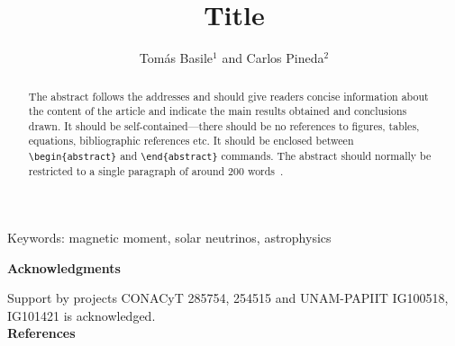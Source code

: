 \documentclass[12pt]{Template/iopart}
\newcommand\keywords[1]{Keywords: #1}
\begin{document}
\title[Title]{Title}

\author{Tomás Basile$^1$ and Carlos Pineda$^2$}

\address{$^1$ Facultad de Ciencias. Universidad Nacional Autónoma de México, Ciudad de México 01000, Mexico}
\address{$^2$ Instituto de Física, Universidad Nacional Autónoma de México, Ciudad de México 01000, México}

\begin{abstract}
The abstract follows the addresses and
should give readers concise information about the content 
of the article and indicate the main results obtained and conclusions 
drawn. It should be self-contained---there should be no references to 
figures, tables, equations, bibliographic references etc.  It should be enclosed between \verb"\begin{abstract}"
and \verb"\end{abstract}" commands.  The abstract should normally be restricted 
to a single paragraph of around 200 words~\cite{bengtsson_zyczkowski_2017}.
\end{abstract}
\keywords{magnetic moment, solar neutrinos, astrophysics} \\
\submitto{\PS}
\maketitle








\newpage
\appendix




\textbf{Acknowledgments}

Support by projects CONACyT 285754, 254515 and UNAM-PAPIIT IG100518, IG101421 is
acknowledged.  \\


\textbf{References}


\end{document}
